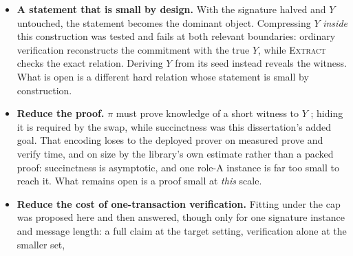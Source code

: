 \begin{itemize}
  \setlength{\itemsep}{0pt}
  \setlength{\parsep}{0pt}
  \item \textbf{A statement that is small by design.} With the signature halved and $Y$
        untouched, the statement becomes the dominant object. Compressing $Y$ \emph{inside}
        this construction was tested and fails at both relevant boundaries: ordinary
        verification reconstructs the commitment with the true $Y$, while \textsc{Extract}
        checks the exact relation. Deriving $Y$ from its seed instead reveals the witness.
        What is open is a different hard relation whose statement is small by construction.
  \item \textbf{Reduce the proof.} $\pi$ must prove knowledge of a short witness to $Y$
        \cite{esgin2020post}; hiding it is required by the swap, while succinctness was
        this dissertation's added goal. That encoding loses to the deployed prover on
        measured prove and verify time, and on size by the library's own estimate rather
        than a packed proof: succinctness is asymptotic, and one role-A instance is far too
        small to reach it. What remains open is a proof small at \emph{this} scale.
  \item \textbf{Reduce the cost of one-transaction verification.} Fitting under the cap was
        proposed here and then answered, though only for one signature instance and message
        length: a full claim at the target setting, verification alone at the smaller set,

\end{itemize}
